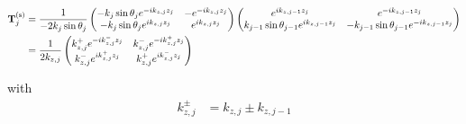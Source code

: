 \begin{align*}
	\vb{T}^{\text{(s)}}_j                      & = \frac{1}{-2 k_j \sin\theta_{j} }
	\pmqty{
	- k_j \sin\theta_{j} e^{-ik_{z,j}z_j}      &
	- e^{-ik_{z,j}z_j}                                                              \\
	- k_j \sin\theta_{j} e^{ik_{z,j}z_j}       &
	e^{ik_{z,j}z_j}
	}
	\pmqty{
	e^{ik_{z,j-1}z_j}                          &
	e^{-ik_{z,j-1}z_j}                                                              \\
	k_{j-1} \sin\theta_{j-1} e^{ik_{z,j-1}z_j} &
	- k_{j-1} \sin\theta_{j-1} e^{-ik_{z,j-1}z_j}
	}                                                                               \\
	                                           & = \frac{1}{2 k_{z,j} }
	\pmqty{
	k_{z,j}^{+} e^{-ik_{z,j}^{-}z_j}           &
	k_{z,j}^{-} e^{-ik_{z,j}^{+}z_j}                                                \\
	k_{z,j}^{-} e^{ik_{z,j}^{+}z_j}            &
	k_{z,j}^{+} e^{ik_{z,j}^{-}z_j}
	}
\end{align*}

with
\begin{align*}
	k_{z,j}^{\pm} & = k_{z,j} \pm k_{z,j-1}
\end{align*}

